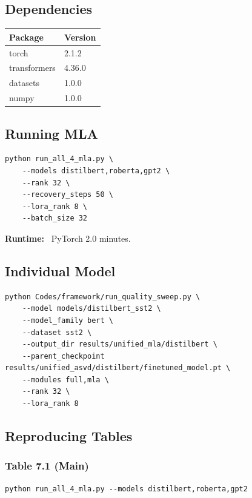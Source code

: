 \subsection{Dependencies}

\begin{table}[H]
\centering
\small
\begin{tabular}{ll}
\toprule
\textbf{Package} & \textbf{Version} \\
\midrule
torch & 2.1.2 \\
transformers & 4.36.0 \\
datasets & 1.0.0 \\
numpy & 1.0.0 \\
\bottomrule
\end{tabular}
\end{table}

\subsection{Running MLA}

\begin{lstlisting}
python run_all_4_mla.py \
    --models distilbert,roberta,gpt2 \
    --rank 32 \
    --recovery_steps 50 \
    --lora_rank 8 \
    --batch_size 32
\end{lstlisting}

\textbf{Runtime:} ~PyTorch 2.0 minutes.

\subsection{Individual Model}

\begin{lstlisting}
python Codes/framework/run_quality_sweep.py \
    --model models/distilbert_sst2 \
    --model_family bert \
    --dataset sst2 \
    --output_dir results/unified_mla/distilbert \
    --parent_checkpoint results/unified_asvd/distilbert/finetuned_model.pt \
    --modules full,mla \
    --rank 32 \
    --lora_rank 8
\end{lstlisting}

\subsection{Reproducing Tables}

\subsubsection{Table 7.1 (Main)}
\begin{lstlisting}
python run_all_4_mla.py --models distilbert,roberta,gpt2
\end{lstlisting}

